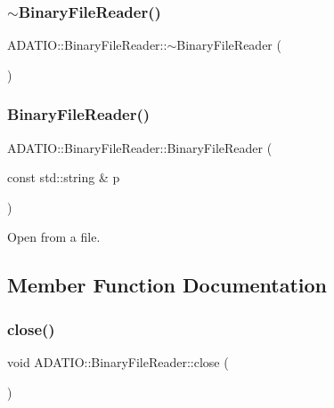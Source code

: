 \subsubsection{\texorpdfstring{$\sim$BinaryFileReader()}{~BinaryFileReader()}\hspace{0.1cm}{\footnotesize\ttfamily [2/2]}}
{\footnotesize\ttfamily A\+D\+A\+T\+I\+O\+::\+Binary\+File\+Reader\+::$\sim$\+Binary\+File\+Reader (\begin{DoxyParamCaption}{ }\end{DoxyParamCaption})}

\mbox{\label{classADATIO_1_1BinaryFileReader_a987273f138d0fcc4a1e9a95c51b093ef}} 
\subsubsection{\texorpdfstring{BinaryFileReader()}{BinaryFileReader()}\hspace{0.1cm}{\footnotesize\ttfamily [4/4]}}
{\footnotesize\ttfamily A\+D\+A\+T\+I\+O\+::\+Binary\+File\+Reader\+::\+Binary\+File\+Reader (\begin{DoxyParamCaption}\item[{const std\+::string \&}]{p }\end{DoxyParamCaption})\hspace{0.3cm}{\ttfamily [explicit]}}



Open from a file. 



\subsection{Member Function Documentation}
\mbox{\label{classADATIO_1_1BinaryFileReader_af0501cb948e5220209226970867dbb26}} 
\subsubsection{\texorpdfstring{close()}{close()}\hspace{0.1cm}{\footnotesize\ttfamily [1/2]}}
{\footnotesize\ttfamily void A\+D\+A\+T\+I\+O\+::\+Binary\+File\+Reader\+::close (\begin{DoxyParamCaption}{ }\end{DoxyParamCaption})}

